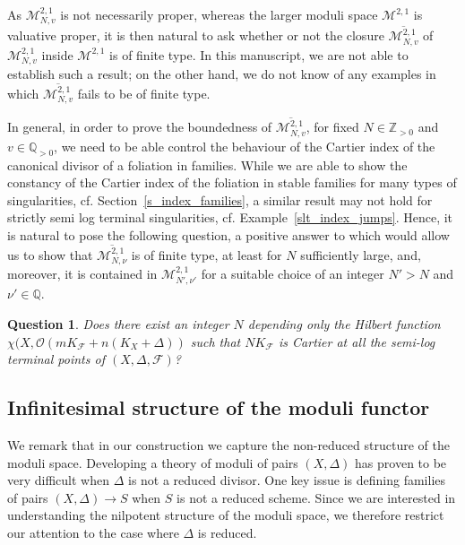 \documentclass[12pt, a4paper]{amsart}
\newtheorem*{question}{Question}
\theoremstyle{definition}
\theoremstyle{named}
\begin{document}
As $\mathcal M^{2,1}_{N, v}$ is not necessarily proper, whereas the larger moduli space $\mathcal M^{2,1}$ is valuative proper, it is then natural to ask whether or not the closure 
$\overline{\mathcal M^{2,1}_{N, v}}$
of 
$\mathcal M^{2,1}_{N, v}$ inside 
$\mathcal M^{2, 1}$ 
is of finite type.
In this manuscript, we are not able to establish such a result;
on the other hand, we do not know of any examples in which 
$\overline{\mathcal M^{2,1}_{N, v}}$
fails to be of finite type.

In general, in order to prove the boundedness of 
$\overline{\mathcal M^{2,1}_{N, v}}$, 
for fixed $N \in \mathbb Z_{>0}$
and $v \in \mathbb Q_{>0}$,
we need to be able control the behaviour of the Cartier index of the canonical divisor of a foliation in families. 
While we are able to show the constancy of the Cartier index of the foliation in stable families for many types of singularities, cf. Section~\ref{s_index_families}, a similar result may not hold for strictly semi log terminal singularities, cf. Example~\ref{slt_index_jumps}.
Hence, it is natural to pose the following question, a positive answer to which would allow us to show that $\overline{\mathcal M^{2, 1}_{N, \nu}}$ is of finite type, at least for $N$ sufficiently large, and, moreover, it is contained in 
$\mathcal M^{2, 1}_{N', \nu'}$
for a suitable choice of an integer
$N' > N$ 
and 
$\nu' \in \mathbb Q$.

\begin{question}
Does there exist an integer $N$ depending only the Hilbert function $\chi(X, \mathcal O(mK_{\mathcal F}+n(K_X+\Delta))$ such that $NK_{\mathcal F}$ is Cartier at all the semi-log terminal points of $(X, \Delta, \mathcal F)$?
\end{question}



\subsection{Infinitesimal structure of the moduli functor}
We remark that in our construction we capture the non-reduced structure of the moduli space.  
Developing a theory of moduli of pairs $(X, \Delta)$ has proven to be very difficult when $\Delta$ is not a reduced divisor.  One key issue is defining families of pairs $(X, \Delta) \to S$ when $S$ is not a reduced scheme. Since we are interested in understanding the nilpotent structure of the moduli space, we therefore restrict our attention to the case 
where $\Delta$ is reduced.  
\end{document}
